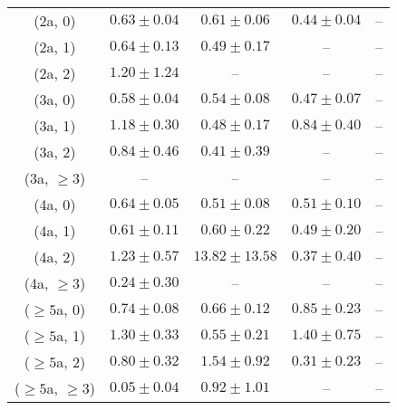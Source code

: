 \begin{table}[h!]
{\begin{tabular}{ccccc}
	(2a, 0) & $0.63\pm 0.04$ & $0.61\pm 0.06$ & $0.44\pm 0.04$ & -- \\[0.5ex] 
	(2a, 1) & $0.64\pm 0.13$ & $0.49\pm 0.17$ & -- & -- \\[0.5ex] 
	(2a, 2) & $1.20\pm 1.24$ & -- & -- & -- \\[0.5ex] 
	(3a, 0) & $0.58\pm 0.04$ & $0.54\pm 0.08$ & $0.47\pm 0.07$ & -- \\[0.5ex] 
	(3a, 1) & $1.18\pm 0.30$ & $0.48\pm 0.17$ & $0.84\pm 0.40$ & -- \\[0.5ex] 
	(3a, 2) & $0.84\pm 0.46$ & $0.41\pm 0.39$ & -- & -- \\[0.5ex] 
	(3a, $\ge3$) & -- & -- & -- & -- \\[0.5ex] 
	(4a, 0) & $0.64\pm 0.05$ & $0.51\pm 0.08$ & $0.51\pm 0.10$ & -- \\[0.5ex] 
	(4a, 1) & $0.61\pm 0.11$ & $0.60\pm 0.22$ & $0.49\pm 0.20$ & -- \\[0.5ex] 
	(4a, 2) & $1.23\pm 0.57$ & $13.82\pm 13.58$ & $0.37\pm 0.40$ & -- \\[0.5ex] 
	(4a, $\ge3$) & $0.24\pm 0.30$ & -- & -- & -- \\[0.5ex] 
	($\ge5$a, 0) & $0.74\pm 0.08$ & $0.66\pm 0.12$ & $0.85\pm 0.23$ & -- \\[0.5ex] 
	($\ge5$a, 1) & $1.30\pm 0.33$ & $0.55\pm 0.21$ & $1.40\pm 0.75$ & -- \\[0.5ex] 
	($\ge5$a, 2) & $0.80\pm 0.32$ & $1.54\pm 0.92$ & $0.31\pm 0.23$ & -- \\[0.5ex] 
	($\ge5$a, $\ge3$) & $0.05\pm 0.04$ & $0.92\pm 1.01$ & -- & -- \\[0.5ex] 
	\hline
	\hline
\end{tabular}}
\end{table}
